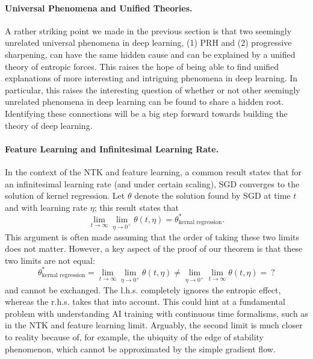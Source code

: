 \documentclass[11pt]{article}
\theoremstyle{plain}
\begin{document}
\vspace{-1mm}
\paragraph{Universal Phenomena and Unified Theories.} A rather striking point we made in the previous section is that two seemingly unrelated universal phenomena in deep learning, (1) PRH and (2) progressive sharpening, can have the same hidden cause and can be explained by a unified theory of entropic forces. This raises the hope of being able to find unified explanations of more interesting and intriguing phenomena in deep learning. In particular, this raises the interesting question of whether or not other seemingly unrelated phenomena in deep learning can be found to share a hidden root. Identifying these connections will be a big step forward towards building the theory of deep learning.

\vspace{-1mm}
\paragraph{Feature Learning and Infinitesimal Learning Rate.} In the context of the NTK and feature learning, a common result states that for an infinitesimal learning rate (and under certain scaling), SGD converges to the solution of kernel regression. Let $\theta$ denote the solution found by SGD at time $t$ and with learning rate $\eta$; this result states that
\begin{equation}
    \lim_{t \to \infty} \lim_{\eta \to 0^+}\theta(t,\eta) = \theta^*_{\text{kernal regression}}.
\end{equation}
This argument is often made assuming that the order of taking these two limits does not matter. However, a key aspect of the proof of our theorem is that these two limits are not equal:
\begin{equation}
    \theta^*_{\text{kernal regression}} = \lim_{t \to \infty} \lim_{\eta \to 0^+}\theta(t,\eta) \neq \lim_{\eta \to 0^+} \lim_{t \to \infty} \theta(t,\eta) =\  ?
\end{equation}
and cannot be exchanged. The l.h.s. completely ignores the entropic effect, whereas the r.h.s. takes that into account. This could hint at a fundamental problem with understanding AI training with continuous time formalisms, such as in the NTK \cite{jacot2018neural} and feature learning \cite{yang2020feature} limit. Arguably, the second limit is much closer to reality because of, for example, the ubiquity of the edge of stability phenomenon, which cannot be approximated by the simple gradient flow. 
\end{document}
